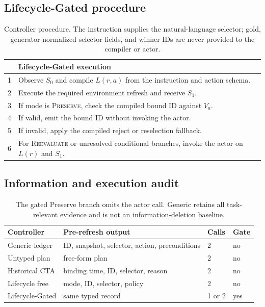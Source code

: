 \documentclass[10pt]{article}
\begin{document}
\subsection{Lifecycle-Gated procedure}
\begin{table}[H]
\centering
\small
\setlength{\tabcolsep}{4pt}
\begin{tabular}{rp{}}
\toprule
& Lifecycle-Gated execution \\
\midrule
1 & Observe $S_0$ and compile $L(r,a)$ from the instruction and action schema. \\
2 & Execute the required environment refresh and receive $S_1$. \\
3 & If mode is \textsc{Preserve}, check the compiled bound ID against $V_a$. \\
4 & If valid, emit the bound ID without invoking the actor. \\
5 & If invalid, apply the compiled reject or reselection fallback. \\
6 & For \textsc{Reevaluate} or unresolved conditional branches, invoke the actor on $L(r)$ and $S_1$. \\
\bottomrule
\end{tabular}
\caption{Controller procedure. The instruction supplies the natural-language selector; gold,
generator-normalized selector fields, and winner IDs are never provided to the compiler or actor.}
\label{tab:supp-procedure}
\end{table}

\subsection{Information and execution audit}
\begin{table}[h]
\centering
\small
\begin{tabular}{llll}
\toprule
Controller & Pre-refresh output & Calls & Gate\\
\midrule
Generic ledger & ID, snapshot, selector, action, preconditions & 2 & no\\
Untyped plan & free-form plan & 2 & no\\
Historical CTA & binding time, ID, selector, reason & 2 & no\\
Lifecycle free & mode, ID, selector, policy & 2 & no\\
Lifecycle-Gated & same typed record & 1 or 2 & yes\\
\bottomrule
\end{tabular}
\caption{The gated Preserve branch omits the actor call. Generic retains all task-relevant
evidence and is not an information-deletion baseline.}
\end{table}
\end{document}
